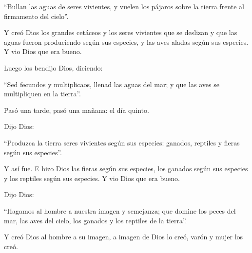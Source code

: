 			\begin{readtalk}“Bullan las aguas de seres vivientes, y vuelen los pájaros sobre la tierra frente al firmamento del cielo”. \end{readtalk}
			
			\begin{readbody}Y creó Dios los grandes cetáceos y los seres vivientes que se deslizan y que las aguas fueron produciendo según sus especies, y las aves aladas según sus especies. Y vio Dios que era bueno. \end{readbody}
			
			\begin{readbody}Luego los bendijo Dios, diciendo: \end{readbody}
			
			\begin{readtalk}“Sed fecundos y multiplicaos, llenad las aguas del mar; y que las aves se multipliquen en la tierra”. \end{readtalk}
			
			\begin{readbody}Pasó una tarde, pasó una mañana: el día quinto. \end{readbody}
			
			\begin{readbody}Dijo Dios: \end{readbody}
			
			\begin{readtalk}“Produzca la tierra seres vivientes según sus especies: ganados, reptiles y fieras según sus especies”. \end{readtalk}
			
			\begin{readbody}Y así fue. E hizo Dios las fieras según sus especies, los ganados según sus especies y los reptiles según sus especies. Y vio Dios que era bueno. \end{readbody}
			
			\begin{readbody}Dijo Dios: \end{readbody}
			
			\begin{readtalk}“Hagamos al hombre a nuestra imagen y semejanza; que domine los peces del mar, las aves del cielo, los ganados y los reptiles de la tierra”. \end{readtalk}
			
			\begin{readbody}Y creó Dios al hombre a su imagen, a imagen de Dios lo creó, varón y mujer los creó. \end{readbody}
			

